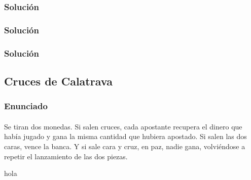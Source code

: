   \begin{frame}
   \frametitle{Solución}


  \end{frame}

  \begin{frame}
   \frametitle{Solución}

   \begin{testfail}
    
   \end{testfail}

  \end{frame}

  \begin{frame}
   \frametitle{Solución}

   \begin{codepass}
    
   \end{codepass}

  \end{frame}


  \subsection{Cruces de Calatrava}

  \begin{frame}
   \frametitle{Enunciado}
   \framesubtitle{}

   Se tiran dos monedas. Si salen cruces, cada apostante recupera el
   dinero que había jugado y gana la misma cantidad que hubiera
   apostado.  Si salen las dos caras, vence la banca.  Y si sale cara y
   cruz, en paz, nadie gana, volviéndose a repetir el lanzamiento de las
   dos piezas.


  \end{frame}


  \begin{frame}
   \begin{exampleblock}
    {}
    {hola}
   \end{exampleblock}
  \end{frame}
